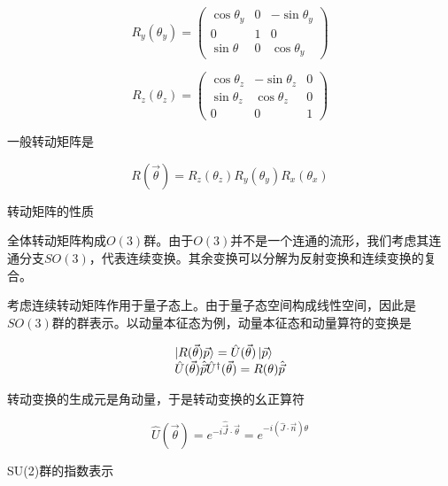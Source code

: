 \begin{equation}
    R_y(\theta_y)=\left(\begin{matrix}
        \cos\theta_y & 0 & -\sin\theta_y \\
        0 & 1 & 0 \\
        \sin\theta & 0 & \cos\theta_y
    \end{matrix}\right)
\end{equation}

\begin{equation}
    R_z(\theta_z)=\left(\begin{matrix}
        \cos\theta_z & -\sin\theta_z & 0 \\
        \sin\theta_z & \cos\theta_z & 0 \\
        0 & 0 & 1
    \end{matrix}\right)
\end{equation}

一般转动矩阵是

\begin{equation}
    R(\vec{\theta})=R_z(\theta_z)R_y(\theta_y)R_x(\theta_x)
\end{equation}

转动矩阵的性质





全体转动矩阵构成$O(3)$群。由于$O(3)$并不是一个连通的流形，我们考虑其连通分支$SO(3)$，代表连续变换。其余变换可以分解为反射变换和连续变换的复合。

考虑连续转动矩阵作用于量子态上。由于量子态空间构成线性空间，因此是$SO(3)$群的群表示。以动量本征态为例，动量本征态和动量算符的变换是

\begin{equation}
    \begin{array}{lr}
        \ket{R(\vec{\theta})\vec{p}}=\hat{U}(\vec{\theta})\ket{\vec{p}} \\
        \hat{U}(\vec{\theta})\hat{\vec{p}}\hat{U}^\dagger(\vec{\theta})=R(\theta)\hat{\vec{p}}
    \end{array}
\end{equation}

转动变换的生成元是角动量，于是转动变换的幺正算符

\begin{equation}
    \hat{U}(\vec{\theta})=e^{-i\hat{\vec{J}}\cdot\vec{\theta}}=e^{-i(\hat{J}\cdot\vec{n})\theta}
\end{equation}

SU(2)群的指数表示

